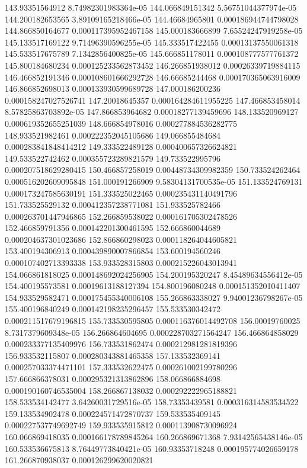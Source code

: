 {143.93351564912 8.74982301983364e-05
144.066849151342 5.56751044377974e-05
144.200182653565 3.89109165218466e-05
144.46684965801 0.000186944744798028
144.866850164677 0.000117395952467158
145.000183666899 7.65524247919258e-05
145.133517169122 9.71496390596255e-05
145.333517422455 0.00013137550061318
145.533517675789 7.1342856400825e-05
145.666851178011 0.000108777577761372
145.800184680234 0.000125233562873452
146.266851938012 0.00026339719884115
146.466852191346 0.000108601666292728
146.66685244468 0.000170365063916009
146.866852698013 0.000133930599689728
147.000186200236 0.000158247027526741
147.20018645357 0.000164284611955225
147.466853458014 8.57825863703892e-05
147.866853964682 0.00018277139459696
148.133520969127 0.000619352655251039
148.666854978016 0.000277884536282775
148.933521982461 0.000222352045105686
149.066855484684 0.000283841848414212
149.333522489128 0.000400657326624821
149.533522742462 0.000355723289821579
149.733522995796 0.000207518629280415
150.466857258019 0.00448734309982359
150.733524262464 0.000516202609095848
151.000191266909 9.58304131700535e-05
151.133524769131 0.000173247585630191
151.333525022465 0.000235431140491796
151.733525529132 0.000412357238771081
151.933525782466 0.000263701447946865
152.266859538022 0.000161705302478526
152.466859791356 0.000142201300461595
152.666860044689 0.000204637301023686
152.866860298023 0.000118264044605821
153.400194306913 0.000439890007866854
153.600194560246 0.000107402713393338
153.933528315803 0.000215226043013941
154.066861818025 0.000148692024256905
154.200195320247 8.45489634556412e-05
154.400195573581 0.00019613188127394
154.800196080248 0.000151352010411407
154.933529582471 0.000175455340006108
155.266863338027 9.94001236798267e-05
155.400196840249 0.000142198235296457
155.533530342472 0.000211517679196815
155.733530595805 0.000116376014492708
156.00019760025 8.7317379609348e-05
156.266864604695 0.000228703271564247
156.466864858029 0.000233377135409976
156.733531862474 0.000212981281819396
156.933532115807 0.000280343881465358
157.133532369141 0.000257033374471101
157.333532622475 0.000261002199780296
157.666866378031 0.000295321313862896
158.066866884698 0.000190160746535004
158.266867138032 0.000292222965188821
158.533534142477 3.64260031729516e-05
158.73353439581 0.000316314583534522
159.133534902478 0.000224571472870737
159.533535409145 0.000227537749692749
159.933535915812 0.000113908730096924
160.066869418035 0.000166178789845264
160.266869671368 7.93142565438146e-05
160.533536675813 8.76449773840421e-05
160.93353718248 0.000195774026659178
161.266870938037 0.000126299620020821
}
